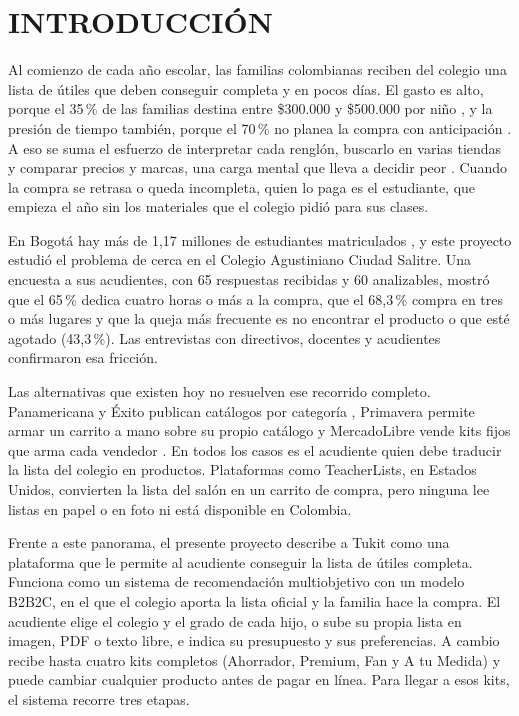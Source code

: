 \section{INTRODUCCIÓN}\label{cap:introduccion}

Al comienzo de cada año escolar, las familias colombianas reciben del colegio una lista de
útiles que deben conseguir completa y en pocos días. El gasto es alto, porque el 35\,\% de
las familias destina entre \$300.000 y \$500.000 por niño \citep{noauthor_resultados_2025},
y la presión de tiempo también, porque el 70\,\% no planea la compra con anticipación
\citep{noauthor_resultados_2024}. A eso se suma el esfuerzo de interpretar cada renglón,
buscarlo en varias tiendas y comparar precios y marcas, una carga mental que lleva a decidir
peor \citep{sweller_cognitive_2011}. Cuando la compra se retrasa o queda incompleta, quien
lo paga es el estudiante, que empieza el año sin los materiales que el colegio pidió para
sus clases.\par

En Bogotá hay más de 1,17 millones de estudiantes matriculados
\citep{noauthor_estadisticas_nodate}, y este proyecto estudió el problema de cerca en el
Colegio Agustiniano Ciudad Salitre. Una encuesta a sus acudientes, con 65 respuestas
recibidas y 60 analizables, mostró que el 65\,\% dedica cuatro horas o más a la compra, que el 68,3\,\% compra
en tres o más lugares y que la queja más frecuente es no encontrar el producto o que esté
agotado (43,3\,\%). Las entrevistas con directivos, docentes y acudientes confirmaron esa
fricción.

Las alternativas que existen hoy no resuelven ese recorrido completo. Panamericana y Éxito
publican catálogos por categoría \citep{panamericana_cotizador_2025,exito_listas_2025},
Primavera permite armar un carrito a mano sobre su propio catálogo
\citep{primavera_armatulista_2026} y MercadoLibre vende kits fijos que arma cada vendedor
\citep{mercadolibre_kits_2025}. En todos los casos es el acudiente quien debe traducir la
lista del colegio en productos. Plataformas como TeacherLists, en Estados Unidos, convierten la lista del salón en un carrito de compra, pero ninguna
lee listas en papel o en foto ni está disponible en Colombia.

Frente a este panorama, el presente proyecto describe a Tukit como una plataforma que le permite al acudiente conseguir la lista de útiles completa.
Funciona como un sistema de recomendación multiobjetivo con un modelo B2B2C, en el que el
colegio aporta la lista oficial y la familia hace la compra. El acudiente elige el colegio y
el grado de cada hijo, o sube su propia lista en imagen, PDF o texto libre, e indica su
presupuesto y sus preferencias. A cambio recibe hasta cuatro kits completos (Ahorrador,
Premium, Fan y A tu Medida) y puede cambiar
cualquier producto antes de pagar en línea. Para llegar a esos kits, el sistema recorre tres etapas.\par

